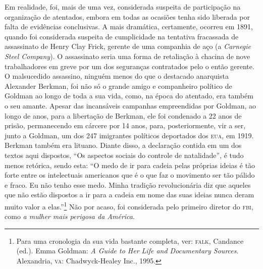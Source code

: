 Em realidade, foi, mais de uma
vez, considerada suspeita de participação na organização de atentados,
embora em todas as ocasiões tenha sido liberada por falta de evidências
conclusivas. A mais dramática, certamente, ocorreu em 1891, quando foi
considerada suspeita de cumplicidade na tentativa fracassada de
assassinato de Henry Clay Frick, gerente de uma companhia de aço (a
\textit{Carnegie Steel Company}). O assassinato seria uma forma de
retaliação à chacina de nove trabalhadores em greve por um dos
seguranças contratados pelo o então gerente. O malsucedido assassino,
ninguém menos do que o destacado anarquista Alexander Berkman, foi não
só o grande amigo e companheiro político de Goldman ao longo de toda a
sua vida, como, na época do atentado, era também o seu amante. Apesar
das incansáveis campanhas empreendidas por Goldman, ao longo de anos,
para a libertação de Berkman, ele foi condenado a 22 anos de
prisão, permanecendo em cárcere por 14 anos, para, posteriormente,
vir a ser, junto a Goldman, um dos 247 imigrantes políticos deportados
dos \textsc{eua}, em 1919. Berkman também era lituano. Diante disso, a declaração
contida em um dos textos aqui dispostos, ``Os aspectos sociais do
controle de natalidade'', é tudo menos retórica, sendo esta: ``O medo de
ir para cadeia pelas próprias ideias é tão forte entre os intelectuais
americanos que é o que faz o movimento ser tão pálido e fraco. Eu não
tenho esse medo. Minha tradição revolucionária diz que aqueles que não
estão dispostos a ir para a cadeia em nome das suas ideias nunca deram
muito valor a elas.''\footnote{Para uma cronologia da sua vida bastante
  completa, ver: \textsc{falk}, Candance (ed.). Emma Goldman: \textit{A Guide to
  Her Life and Documentary Sources}. Alexandria, \textsc{va}: Chadwyck-Healey
  Inc., 1995.} Não por acaso, foi considerada pelo primeiro diretor do
\textsc{fbi}, como \textit{a mulher mais perigosa da América}.


